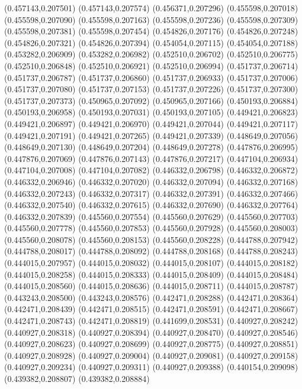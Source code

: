 (0.457143,0.207501)
(0.457143,0.207574)
(0.456371,0.207296)
(0.455598,0.207018)
(0.455598,0.207090)
(0.455598,0.207163)
(0.455598,0.207236)
(0.455598,0.207309)
(0.455598,0.207381)
(0.455598,0.207454)
(0.454826,0.207176)
(0.454826,0.207248)
(0.454826,0.207321)
(0.454826,0.207394)
(0.454054,0.207115)
(0.454054,0.207188)
(0.453282,0.206909)
(0.453282,0.206982)
(0.452510,0.206702)
(0.452510,0.206775)
(0.452510,0.206848)
(0.452510,0.206921)
(0.452510,0.206994)
(0.451737,0.206714)
(0.451737,0.206787)
(0.451737,0.206860)
(0.451737,0.206933)
(0.451737,0.207006)
(0.451737,0.207080)
(0.451737,0.207153)
(0.451737,0.207226)
(0.451737,0.207300)
(0.451737,0.207373)
(0.450965,0.207092)
(0.450965,0.207166)
(0.450193,0.206884)
(0.450193,0.206958)
(0.450193,0.207031)
(0.450193,0.207105)
(0.449421,0.206823)
(0.449421,0.206897)
(0.449421,0.206970)
(0.449421,0.207044)
(0.449421,0.207117)
(0.449421,0.207191)
(0.449421,0.207265)
(0.449421,0.207339)
(0.448649,0.207056)
(0.448649,0.207130)
(0.448649,0.207204)
(0.448649,0.207278)
(0.447876,0.206995)
(0.447876,0.207069)
(0.447876,0.207143)
(0.447876,0.207217)
(0.447104,0.206934)
(0.447104,0.207008)
(0.447104,0.207082)
(0.446332,0.206798)
(0.446332,0.206872)
(0.446332,0.206946)
(0.446332,0.207020)
(0.446332,0.207094)
(0.446332,0.207168)
(0.446332,0.207243)
(0.446332,0.207317)
(0.446332,0.207391)
(0.446332,0.207466)
(0.446332,0.207540)
(0.446332,0.207615)
(0.446332,0.207690)
(0.446332,0.207764)
(0.446332,0.207839)
(0.445560,0.207554)
(0.445560,0.207629)
(0.445560,0.207703)
(0.445560,0.207778)
(0.445560,0.207853)
(0.445560,0.207928)
(0.445560,0.208003)
(0.445560,0.208078)
(0.445560,0.208153)
(0.445560,0.208228)
(0.444788,0.207942)
(0.444788,0.208017)
(0.444788,0.208092)
(0.444788,0.208168)
(0.444788,0.208243)
(0.444015,0.207957)
(0.444015,0.208032)
(0.444015,0.208107)
(0.444015,0.208182)
(0.444015,0.208258)
(0.444015,0.208333)
(0.444015,0.208409)
(0.444015,0.208484)
(0.444015,0.208560)
(0.444015,0.208636)
(0.444015,0.208711)
(0.444015,0.208787)
(0.443243,0.208500)
(0.443243,0.208576)
(0.442471,0.208288)
(0.442471,0.208364)
(0.442471,0.208439)
(0.442471,0.208515)
(0.442471,0.208591)
(0.442471,0.208667)
(0.442471,0.208743)
(0.442471,0.208819)
(0.441699,0.208531)
(0.440927,0.208242)
(0.440927,0.208318)
(0.440927,0.208394)
(0.440927,0.208470)
(0.440927,0.208546)
(0.440927,0.208623)
(0.440927,0.208699)
(0.440927,0.208775)
(0.440927,0.208851)
(0.440927,0.208928)
(0.440927,0.209004)
(0.440927,0.209081)
(0.440927,0.209158)
(0.440927,0.209234)
(0.440927,0.209311)
(0.440927,0.209388)
(0.440154,0.209098)
(0.439382,0.208807)
(0.439382,0.208884)
